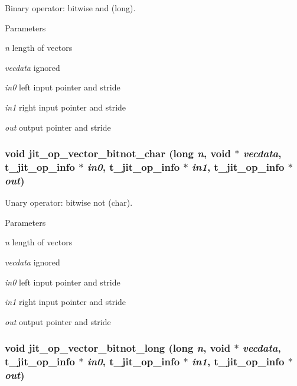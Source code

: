 Binary operator: bitwise and (long). 
\begin{DoxyParams}{Parameters}
\item[{\em n}]length of vectors \item[{\em vecdata}]ignored \item[{\em in0}]left input pointer and stride \item[{\em in1}]right input pointer and stride \item[{\em out}]output pointer and stride \end{DoxyParams}
\hypertarget{group__opvecmod_ga041bdada970cd8a0b999df5ebfbea61b}{
\subsubsection[{jit\_\-op\_\-vector\_\-bitnot\_\-char}]{\setlength{\rightskip}{0pt plus 5cm}void jit\_\-op\_\-vector\_\-bitnot\_\-char (long {\em n}, \/  void $\ast$ {\em vecdata}, \/  {\bf t\_\-jit\_\-op\_\-info} $\ast$ {\em in0}, \/  {\bf t\_\-jit\_\-op\_\-info} $\ast$ {\em in1}, \/  {\bf t\_\-jit\_\-op\_\-info} $\ast$ {\em out})}}
\label{group__opvecmod_ga041bdada970cd8a0b999df5ebfbea61b}


Unary operator: bitwise not (char). 
\begin{DoxyParams}{Parameters}
\item[{\em n}]length of vectors \item[{\em vecdata}]ignored \item[{\em in0}]left input pointer and stride \item[{\em in1}]right input pointer and stride \item[{\em out}]output pointer and stride \end{DoxyParams}
\hypertarget{group__opvecmod_gaddf8d190578e7549c6cce45bbf7a7a93}{
\subsubsection[{jit\_\-op\_\-vector\_\-bitnot\_\-long}]{\setlength{\rightskip}{0pt plus 5cm}void jit\_\-op\_\-vector\_\-bitnot\_\-long (long {\em n}, \/  void $\ast$ {\em vecdata}, \/  {\bf t\_\-jit\_\-op\_\-info} $\ast$ {\em in0}, \/  {\bf t\_\-jit\_\-op\_\-info} $\ast$ {\em in1}, \/  {\bf t\_\-jit\_\-op\_\-info} $\ast$ {\em out})}}
\label{group__opvecmod_gaddf8d190578e7549c6cce45bbf7a7a93}


